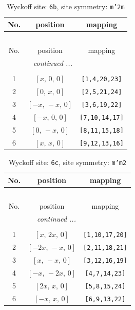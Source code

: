 \documentclass[fleqn,8pt]{jsarticle}
\begin{document}
\begin{longtable}{ccc}
\caption{Wyckoff site: {\tt 6b}, site symmetry: {\tt m'2m}}
 \\
 \hline \hline
No. & position & mapping \\ \hline \endfirsthead

\multicolumn{2}{l}{\tablename\ \thetable{}} \\
 \hline \hline
No. & position & mapping \\ \hline \endhead

 \hline \hline
\multicolumn{2}{r}{\footnotesize\it continued ...} \\ \endfoot

 \hline \hline
\multicolumn{2}{r}{} \\ \endlastfoot

1 & $\left[ x,\, 0,\, 0 \right]$ & {\tt [1,4,20,23]} \\ \hline
2 & $\left[ 0,\, x,\, 0 \right]$ & {\tt [2,5,21,24]} \\ \hline
3 & $\left[ - x,\, - x,\, 0 \right]$ & {\tt [3,6,19,22]} \\ \hline
4 & $\left[ - x,\, 0,\, 0 \right]$ & {\tt [7,10,14,17]} \\ \hline
5 & $\left[ 0,\, - x,\, 0 \right]$ & {\tt [8,11,15,18]} \\ \hline
6 & $\left[ x,\, x,\, 0 \right]$ & {\tt [9,12,13,16]} \\
\end{longtable}
\renewcommand{\arraystretch}{1.2}
\begin{longtable}{ccc}
\caption{Wyckoff site: {\tt 6c}, site symmetry: {\tt m'm2}}
 \\
 \hline \hline
No. & position & mapping \\ \hline \endfirsthead

\multicolumn{2}{l}{\tablename\ \thetable{}} \\
 \hline \hline
No. & position & mapping \\ \hline \endhead

 \hline \hline
\multicolumn{2}{r}{\footnotesize\it continued ...} \\ \endfoot

 \hline \hline
\multicolumn{2}{r}{} \\ \endlastfoot

1 & $\left[ x,\, 2 x,\, 0 \right]$ & {\tt [1,10,17,20]} \\ \hline
2 & $\left[ - 2 x,\, - x,\, 0 \right]$ & {\tt [2,11,18,21]} \\ \hline
3 & $\left[ x,\, - x,\, 0 \right]$ & {\tt [3,12,16,19]} \\ \hline
4 & $\left[ - x,\, - 2 x,\, 0 \right]$ & {\tt [4,7,14,23]} \\ \hline
5 & $\left[ 2 x,\, x,\, 0 \right]$ & {\tt [5,8,15,24]} \\ \hline
6 & $\left[ - x,\, x,\, 0 \right]$ & {\tt [6,9,13,22]} \\
\end{longtable}
\end{document}

